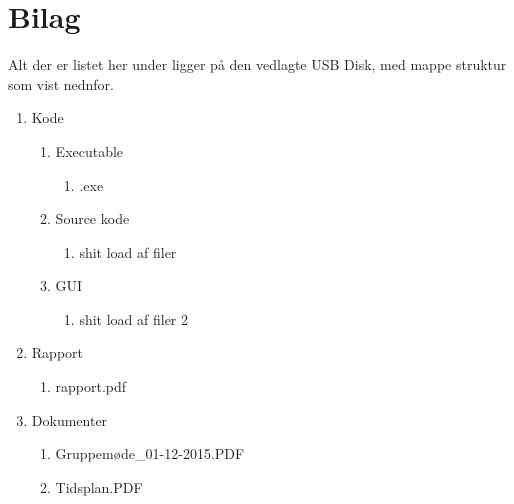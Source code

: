 \appendix
\section{Bilag} \hfill
Alt der er listet her under ligger på den vedlagte USB Disk, med mappe struktur som vist nednfor.

\begin{enumerate}[noitemsep]
	\item Kode
	\begin{enumerate}[noitemsep]
		\item Executable
		\begin{enumerate}[noitemsep]
			\item .exe
		\end{enumerate}
		\item Source kode
		\begin{enumerate}[noitemsep]
			\item shit load af filer
		\end{enumerate}
		\item GUI
		\begin{enumerate}[noitemsep]
			\item shit load af filer 2
		\end{enumerate}
	\end{enumerate}
	\item Rapport
	\begin{enumerate}[noitemsep]
		\item rapport.pdf
	\end{enumerate}
	\item Dokumenter
	\begin{enumerate}[noitemsep]
		\item Gruppemøde_01-12-2015.PDF \label{itm:Modereferat1}
		\item Tidsplan.PDF \label{itm:Tidsplan1}
	\end{enumerate}
\end{enumerate}